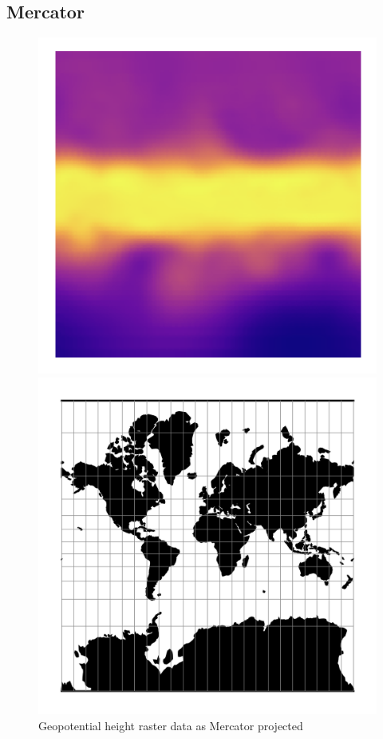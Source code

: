 \subsection{Mercator}
\begin{figure}[H]
    \centering
    \begin{minipage}{0.30\textwidth}
        \centering
        \includegraphics[width=0.9\linewidth]{figures/chapter-8/geopoth_mercator.png}
        \caption{ Geopotential height raster data as Mercator projected}
        \label{fig:merc_geopoth_raster}
    \end{minipage}\hfill
    \begin{minipage}{0.30\textwidth}
        \centering
        \includegraphics[width=0.9\linewidth]{figures/chapter-8/merc.png}

\end{minipage}
\end{figure}
